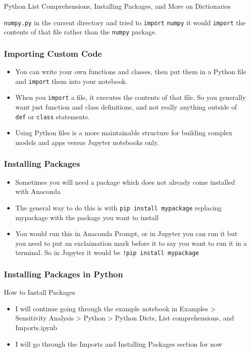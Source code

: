 \documentclass[handout, 11pt]{beamer}
\begin{document}
\begin{section}{Python List Comprehensions, Installing Packages, and More on Dictionaries}
\begin{frame}
\begin{itemize}
\texttt{numpy.py}
in the current directory and tried to
\texttt{import}
\texttt{numpy}
it would
\texttt{import}
the contents of that file rather than the
\texttt{numpy}
package.
\end{itemize}
\end{frame}
\begin{frame}
\frametitle{Importing Custom Code}
\begin{itemize}
\item You can write your own functions and classes, then put them in a Python file and
\texttt{import}
them into your notebook.
\vfill
\item When you
\texttt{import}
a file, it executes the contents of that file. So you generally want just function and class definitions, and not really anything outside of
\texttt{def}
or
\texttt{class}
statements.
\vfill
\item Using Python files is a more maintainable structure for building complex models and apps versus Jupyter notebooks only.
\end{itemize}
\end{frame}
\begin{frame}
\frametitle{Installing Packages}
\begin{itemize}
\item Sometimes you will need a package which does not already come installed with Anaconda
\vfill
\item The general way to do this is with
\texttt{pip install mypackage}
replacing mypackage with
the package you want to install
\vfill
\item You would run this in Anaconda Prompt, or in Jupyter you can run it but you need to put an exclaimation mark before it to say you want to run it in a terminal. So in Jupyter it would be
\texttt{!pip install mypackage}
\end{itemize}
\end{frame}
\begin{frame}
\frametitle{Installing Packages in Python}
{
\begin{block}{How to Install Packages}
\begin{itemize}
\item I will continue going through the example notebook in Examples > Sensitivity Analysis > Python > Python Dicts, List comprehensions, and Imports.ipynb
\item I will go through the Imports and Installing Packages section for now
\end{itemize}
\end{block}
}
\end{frame}
\end{section}
\end{document}
